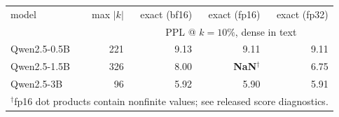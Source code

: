 \begin{tabular}{l r r r r}
\toprule
model & max $|k|$ & exact (bf16) & exact (fp16) & exact (fp32) \\
 & & \multicolumn{3}{c}{PPL @ $k{=}10\%$, dense in text} \\
\midrule
Qwen2.5-0.5B & 221 & 9.13 & 9.11 & 9.11 \\
Qwen2.5-1.5B & 326 & 8.00 & \textbf{NaN}$^{\dagger}$ & 6.75 \\
Qwen2.5-3B & 96 & 5.92 & 5.90 & 5.91 \\
\bottomrule
\multicolumn{5}{l}{\footnotesize $^{\dagger}$fp16 dot products contain nonfinite values; see released score diagnostics.} \\
\end{tabular}
